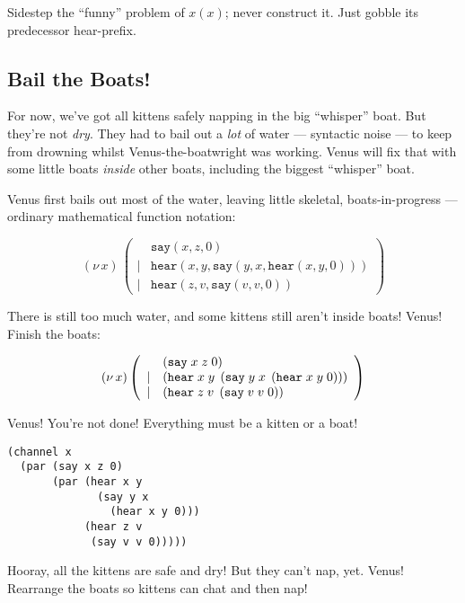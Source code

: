 \documentclass[10pt,oneside,x11names]{article}
\newcommand\napping    [0]{0}
\newcommand\whispering [2]{(\nu\,#1)\,{#2}}
\theoremstyle{definition}
\theoremstyle{warning}
\newcommand\say [3]{\left(\texttt{say}\thickspace{}#1\thickspace{}#2\thickspace{}#3\right)}
\newcommand\hear[3]{\left(\texttt{hear}\thickspace{}#1\thickspace{}#2\thickspace{}#3\right)}
\newcommand\kitA{\say{x}{z}{\napping}}
\newcommand\kitB{\hear{x}{y}{\say{y}{x}{\hear{x}{y}{\napping}}}}
\newcommand\kitC{\hear{z}{v}{\say{v}{v}{\napping}}}
\begin{document}
Sidestep the ``funny'' problem of \(x(x)\); never construct it.
Just gobble its predecessor hear-prefix.

\subsection{Bail the Boats!}
\label{sec:org0bd9305}

For now, we've got all kittens safely napping in the big
``whisper'' boat. But they're not \emph{dry}. They had to bail out a
\emph{lot} of water --- syntactic noise --- to keep from drowning
whilst Venus-the-boatwright was working. Venus will fix that
with some little boats \emph{inside} other boats, including the
biggest ``whisper'' boat.

Venus first bails out most of the water, leaving little skeletal,
boats-in-progress --- ordinary mathematical function notation:

\begin{equation}
\whispering{x}{\left(
\begin{array}{clll}
 {}     & \texttt{say} (x, z, \napping) \\
 \vert  & \texttt{hear}(x, y, \texttt{say}(y, x, \texttt{hear}(x, y, \napping))) \\
 \vert  & \texttt{hear}(z, v, \texttt{say}(v, v, \napping))
\end{array}\right)}
\end{equation}

There is still too much water, and some kittens
still aren't inside boats! Venus! Finish the boats:

\begin{equation}
\whispering{x}{\left(
\begin{array}{clll}
 {}     & \kitA \\
 \vert  & \kitB \\
 \vert  & \kitC \\
\end{array}\right)}
\end{equation}

Venus! You're not done! Everything must be a kitten or a boat!

\vskip 0.26cm
\begin{verbatim}
(channel x
  (par (say x z 0)
       (par (hear x y
              (say y x
                (hear x y 0)))
            (hear z v
             (say v v 0)))))
\end{verbatim}

Hooray, all the kittens are safe and dry! But they can't nap, yet.
Venus! Rearrange the boats so kittens can chat and then nap!
\end{document}
